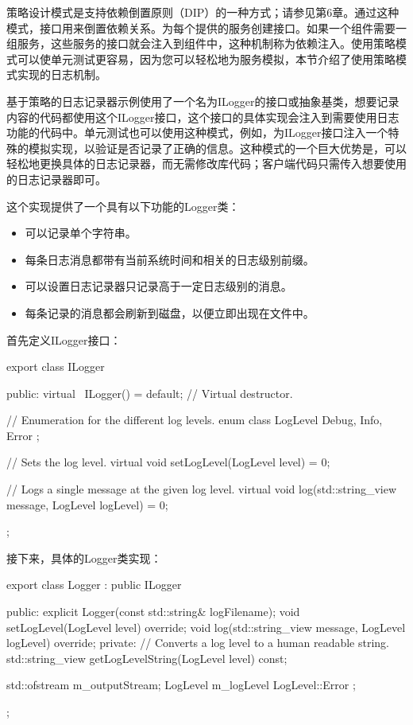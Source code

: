 
策略设计模式是支持依赖倒置原则（DIP）的一种方式；请参见第6章。通过这种模式，接口用来倒置依赖关系。为每个提供的服务创建接口。如果一个组件需要一组服务，这些服务的接口就会注入到组件中，这种机制称为依赖注入。使用策略模式可以使单元测试更容易，因为您可以轻松地为服务模拟，本节介绍了使用策略模式实现的日志机制。


基于策略的日志记录器示例使用了一个名为ILogger的接口或抽象基类，想要记录内容的代码都使用这个ILogger接口，这个接口的具体实现会注入到需要使用日志功能的代码中。单元测试也可以使用这种模式，例如，为ILogger接口注入一个特殊的模拟实现，以验证是否记录了正确的信息。这种模式的一个巨大优势是，可以轻松地更换具体的日志记录器，而无需修改库代码；客户端代码只需传入想要使用的日志记录器即可。


这个实现提供了一个具有以下功能的Logger类：

\begin{itemize}
\item
可以记录单个字符串。

\item
每条日志消息都带有当前系统时间和相关的日志级别前缀。

\item
可以设置日志记录器只记录高于一定日志级别的消息。

\item
每条记录的消息都会刷新到磁盘，以便立即出现在文件中。
\end{itemize}

首先定义ILogger接口：

\begin{cpp}
export class ILogger
{
    public:
        virtual ~ILogger() = default; // Virtual destructor.

        // Enumeration for the different log levels.
        enum class LogLevel { Debug, Info, Error };

        // Sets the log level.
        virtual void setLogLevel(LogLevel level) = 0;

        // Logs a single message at the given log level.
        virtual void log(std::string_view message, LogLevel logLevel) = 0;
};
\end{cpp}

接下来，具体的Logger类实现：

\begin{cpp}
export class Logger : public ILogger
{
    public:
        explicit Logger(const std::string& logFilename);
        void setLogLevel(LogLevel level) override;
        void log(std::string_view message, LogLevel logLevel) override;
    private:
        // Converts a log level to a human readable string.
        std::string_view getLogLevelString(LogLevel level) const;

        std::ofstream m_outputStream;
        LogLevel m_logLevel { LogLevel::Error };
};
\end{cpp}

